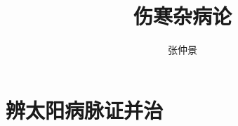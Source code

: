 \documentclass[a4paper, twocolumn, AutoFakeBold]{cvertbook} %
\begin{document}
\title{伤寒杂病论} %
\author{张仲景}

\tableofcontents

\inmain %
\part{辨太阳病脉证并治}

\end{document}
